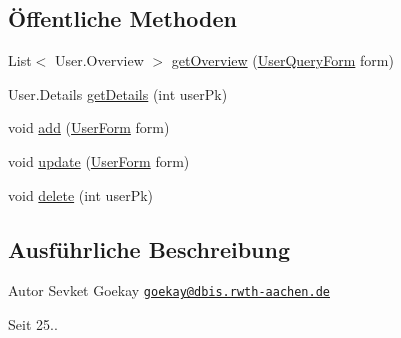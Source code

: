 \subsection*{Öffentliche Methoden}
\begin{DoxyCompactItemize}
\item 
List$<$ User.\+Overview $>$ \hyperlink{classde_1_1rwth_1_1idsg_1_1steve_1_1repository_1_1impl_1_1_user_repository_impl_ac3ecc6e753534fdf092a492c692cb71e}{get\+Overview} (\hyperlink{classde_1_1rwth_1_1idsg_1_1steve_1_1web_1_1dto_1_1_user_query_form}{User\+Query\+Form} form)
\item 
User.\+Details \hyperlink{classde_1_1rwth_1_1idsg_1_1steve_1_1repository_1_1impl_1_1_user_repository_impl_aaad9fca25e2258f7913925814fd2917b}{get\+Details} (int user\+Pk)
\item 
void \hyperlink{classde_1_1rwth_1_1idsg_1_1steve_1_1repository_1_1impl_1_1_user_repository_impl_aa16fc4e4079585612b8bf668c7a5f32a}{add} (\hyperlink{classde_1_1rwth_1_1idsg_1_1steve_1_1web_1_1dto_1_1_user_form}{User\+Form} form)
\item 
void \hyperlink{classde_1_1rwth_1_1idsg_1_1steve_1_1repository_1_1impl_1_1_user_repository_impl_a3b0b8f105df28fd92c342aed64487920}{update} (\hyperlink{classde_1_1rwth_1_1idsg_1_1steve_1_1web_1_1dto_1_1_user_form}{User\+Form} form)
\item 
void \hyperlink{classde_1_1rwth_1_1idsg_1_1steve_1_1repository_1_1impl_1_1_user_repository_impl_af6ac78abc5a260261d071e2177e099aa}{delete} (int user\+Pk)
\end{DoxyCompactItemize}


\subsection{Ausführliche Beschreibung}
\begin{DoxyAuthor}{Autor}
Sevket Goekay \href{mailto:goekay@dbis.rwth-aachen.de}{\tt goekay@dbis.\+rwth-\/aachen.\+de} 
\end{DoxyAuthor}
\begin{DoxySince}{Seit}
25.. 
\end{DoxySince}


